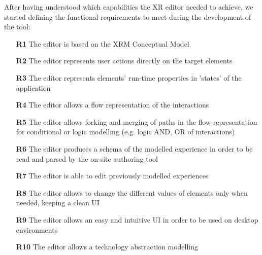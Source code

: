 After having understood which capabilities the XR editor needed to achieve, we started defining the functional requirements to meet during the development of the tool:
\begin{itemize}
    \item[\textbf{R1}] The editor is based on the XRM Conceptual Model
    \item[\textbf{R2}] The editor represents user actions directly on the target elements
    \item[\textbf{R3}] The editor represents elements' run-time properties in 'states' of the application
    \item[\textbf{R4}] The editor allows a flow representation of the interactions
    \item[\textbf{R5}] The editor allows forking and merging of paths in the flow representation for conditional or logic modelling (e.g. logic AND, OR of interactions)
    \item[\textbf{R6}] The editor produces a schema of the modelled experience in order to be read and parsed by the on-site authoring tool
    \item[\textbf{R7}] The editor is able to edit previously modelled experiences
    \item[\textbf{R8}] The editor allows to change the different values of elements only when needed, keeping a clean \gls{UI}
    \item[\textbf{R9}] The editor allows an easy and intuitive UI in order to be used on desktop environments
    \item[\textbf{R10}] The editor allows a technology abstraction modelling
\end{itemize}

